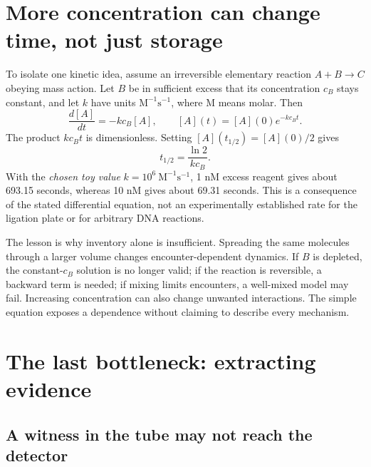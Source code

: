 \section{More concentration can change time, not just storage}

To isolate one kinetic idea, assume an irreversible elementary reaction $A+B\to C$ obeying mass action. Let $B$ be in sufficient excess that its concentration $c_B$ stays constant, and let $k$ have units $\mathrm{M}^{-1}\mathrm{s}^{-1}$, where $\mathrm M$ means molar. Then
\begin{equation}
\frac{d[A]}{dt}=-kc_B[A],\qquad
[A](t)=[A](0)e^{-kc_Bt}. \label{eq:kinetics}
\end{equation}
The product $kc_Bt$ is dimensionless. Setting $[A](t_{1/2})=[A](0)/2$ gives
\begin{equation}
t_{1/2}=\frac{\ln2}{kc_B}. \label{eq:halftime}
\end{equation}
With the \emph{chosen toy value} $k=10^6\ \mathrm{M}^{-1}\mathrm{s}^{-1}$, 1 nM excess reagent gives about 693.15 seconds, whereas 10 nM gives about 69.31 seconds. This is a consequence of the stated differential equation, not an experimentally established rate for the ligation plate or for arbitrary DNA reactions.

The lesson is why inventory alone is insufficient. Spreading the same molecules through a larger volume changes encounter-dependent dynamics. If $B$ is depleted, the constant-$c_B$ solution is no longer valid; if the reaction is reversible, a backward term is needed; if mixing limits encounters, a well-mixed model may fail. Increasing concentration can also change unwanted interactions. The simple equation exposes a dependence without claiming to describe every mechanism.

\section{The last bottleneck: extracting evidence}

\subsection{A witness in the tube may not reach the detector}


